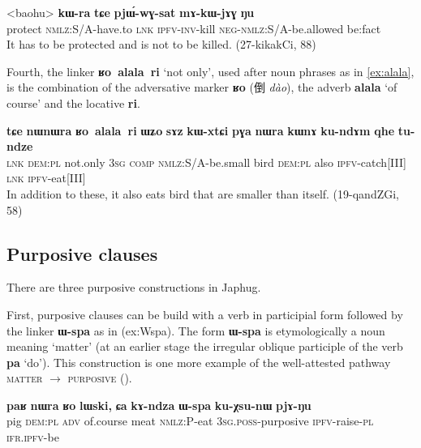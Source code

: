 \documentclass[oldfontcommands,oneside,a4paper,11pt]{article}
\newcommand{\ipa}[1]{\mbox{\phon\textbf{#1}}} %
\newcommand{\zh}[1]{{\cn #1}}
\begin{document}
 \begin{exe}
\ex \label{ex:mAkWjAG2}
\gll
<baohu> 	\ipa{kɯ-ra} 	\ipa{tɕe} 	\ipa{pjɯ́-wɣ-sat} 	\ipa{mɤ-kɯ-jɤɣ} \ipa{ŋu} \\
protect \textsc{nmlz}:S/A-have.to \textsc{lnk} \textsc{ipfv-inv}-kill \textsc{neg-nmlz}:S/A-be.allowed be:fact \\ 
\glt It has to be protected and is not to be killed. (27-kikakCi, 88)
\end{exe}

Fourth, the linker \ipa{ʁo alala ri} `not only', used after noun phrases as in \ref{ex:alala}, is the combination of the adversative marker \ipa{ʁo} (\zh{倒}  \textit{dào}), the adverb \ipa{alala} `of course' and the locative \ipa{ri}.

 \begin{exe}
\ex \label{ex:alala}
\gll  \ipa{tɕe} 	\ipa{nɯnɯra} 	\ipa{ʁo alala ri} 	\ipa{ɯʑo} 	\ipa{sɤz} 	\ipa{kɯ-xtɕi} 	\ipa{pɣa} 	\ipa{nɯra} 	\ipa{kɯnɤ} 	\ipa{ku-ndɤm} 	\ipa{qhe} 	\ipa{tu-ndze} \\
\textsc{lnk} \textsc{dem:pl} not.only \textsc{3sg} \textsc{comp} \textsc{nmlz}:S/A-be.small bird \textsc{dem:pl} also \textsc{ipfv}-catch[III] \textsc{lnk} \textsc{ipfv}-eat[III] \\
\glt In addition to these, it also eats bird that are smaller than itself. (19-qandZGi, 58)
\end{exe}

 \subsection{Purposive clauses}
There are three purposive constructions in Japhug.

   First, purposive clauses can be build with a verb in participial form followed by the linker \ipa{ɯ-spa} as in ({ex:Wspa}).  The form \ipa{ɯ-spa} is etymologically a noun meaning `matter' (at an earlier stage the irregular oblique participle of the verb \ipa{pa} `do'). This construction is one more example of the well-attested pathway \textsc{matter} $\rightarrow$ \textsc{purposive} (\citealt[212]{heine-kuteva02}).


\begin{exe}
\ex \label{ex:Wspa}
\gll \ipa{paʁ} 	\ipa{nɯra} 	\ipa{ʁo} 	\ipa{lɯski,} 	\ipa{ɕa} 	\ipa{kɤ-ndza} 	\ipa{ɯ-spa} 	\ipa{ku-χsu-nɯ} 	\ipa{pjɤ-ŋu}  \\
pig \textsc{dem:pl} \textsc{adv} of.course meat \textsc{nmlz}:P-eat \textsc{3sg.poss}-purposive \textsc{ipfv}-raise-\textsc{pl} \textsc{ifr.ipfv}-be \\
\glt 
\end{exe}
 
\end{document}
